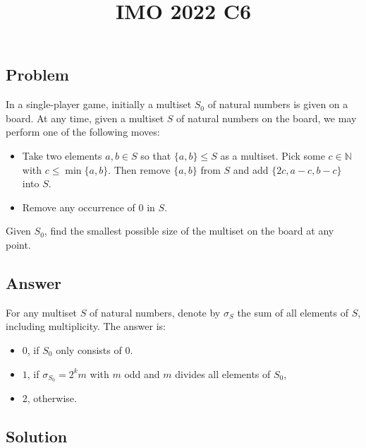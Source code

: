 \documentclass{article}
\title{IMO 2022 C6}
\author{}
\date{}
\newcommand{\N}{\mathbb{N}}
\begin{document}
\maketitle



\subsection*{Problem}

In a single-player game, initially a multiset $S_0$ of natural numbers is given on a board.
At any time, given a multiset $S$ of natural numbers on the board, we may perform one of the following moves:

\begin{itemize}

    \item
    Take two elements $a, b \in S$ so that $\{a, b\} \leq S$ as a multiset.
    Pick some $c \in \N$ with $c \leq \min\{a, b\}$.
    Then remove $\{a, b\}$ from $S$ and add $\{2c, a - c, b - c\}$ into $S$.

    \item
    Remove any occurrence of $0$ in $S$.

\end{itemize}

Given $S_0$, find the smallest possible size of the multiset on the board at any point.



\subsection*{Answer}

For any multiset $S$ of natural numbers, denote by $\sigma_S$ the sum of all elements of $S$, including multiplicity.
The answer is:

\begin{itemize}

    \item 
    $0$, if $S_0$ only consists of $0$.

    \item
    $1$, if $\sigma_{S_0} = 2^k m$ with $m$ odd and $m$ divides all elements of $S_0$,

    \item
    $2$, otherwise.

\end{itemize}



\subsection*{Solution}
\end{document}
